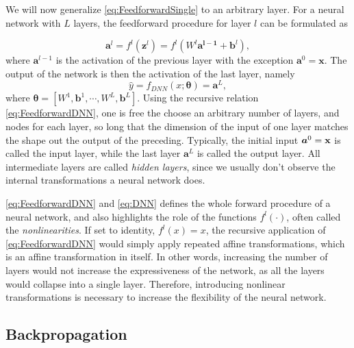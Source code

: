 We will now generalize \autoref{eq:FeedforwardSingle} to an arbitrary layer. For a neural network with $L$ layers, the feedforward procedure for layer $l$ can be formulated as 

\begin{equation}\label{eq:FeedforwardDNN}
    \boldsymbol{a}^l = f^l(\boldsymbol{z}^l) = f^l(W^l \boldsymbol{a^{l-1}} + \boldsymbol{b}^l),
\end{equation}
where $\boldsymbol{a}^{l-1}$ is the activation of the previous layer with the exception $\boldsymbol{a}^{0} = \boldsymbol{x}$. The output of the network is then the activation of the last layer, namely 
\begin{equation}\label{eq:DNN}
    \hat{y} = f_{DNN}(x;\boldsymbol{\theta}) = \boldsymbol{a}^{L},
\end{equation}
where $\boldsymbol{\theta} = [W^1, \boldsymbol{b}^1, \cdots, W^L,  \boldsymbol{b}^L]$. Using the recursive relation \autoref{eq:FeedforwardDNN}, one is free the choose an arbitrary number of layers, and nodes for each layer, so long that the dimension of the input of one layer matches the shape out the output of the preceding. Typically, the initial input $\boldsymbol{a}^0 = \bold{x}$ is called the input layer, while the last layer $\boldsymbol{a}^L$ is called the output layer. All intermediate layers are called \emph{hidden layers}, since we usually don't observe the internal transformations a neural network does.

\autoref{eq:FeedforwardDNN} and \autoref{eq:DNN} defines the whole forward procedure of a neural network, and also highlights the role of the functions $f^l(\cdot)$, often called the \emph{nonlinearities}. If set to identity, $f^l(x) = x$, the recursive application of \autoref{eq:FeedforwardDNN} would simply apply repeated affine transformations, which is an affine transformation in itself. In other words, increasing the number of layers would not increase the expressiveness of the network, as all the layers would collapse into a single layer. Therefore, introducing nonlinear transformations is necessary to increase the flexibility of the neural network. 

\subsection{Backpropagation}\label{sec:BackpropogationDNN}

